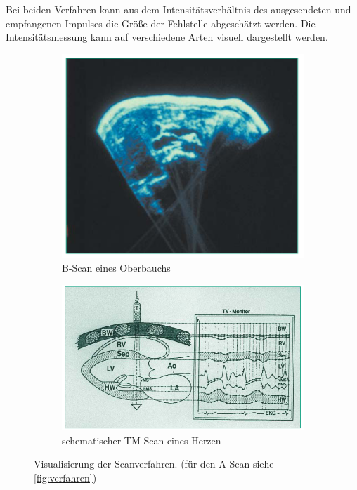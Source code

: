 Bei beiden Verfahren kann aus dem Intensitätsverhältnis des ausgesendeten und empfangenen Impulses die Größe der Fehlstelle abgeschätzt werden.
Die Intensitätsmessung kann auf verschiedene Arten visuell dargestellt werden. 

\begin{figure}
    \centering
    \begin{subfigure}{0.3\textwidth}
        \centering
        \includegraphics[width=\textwidth]{images/b-scan.png}
        \caption{B-Scan eines Oberbauchs}
        \label{fig:b-scan}
    \end{subfigure}
    \begin{subfigure}{0.5\textwidth}
        \centering
        \includegraphics[width=\textwidth]{images/tm-scan.png}
        \caption{schematischer TM-Scan eines Herzen}
        \label{fig:tm-scan}
    \end{subfigure}
    \caption{Visualisierung der Scanverfahren.\cite{ultraschall-scans} (für den A-Scan siehe \autoref{fig:verfahren})}
    \label{fig:scans}
\end{figure}

